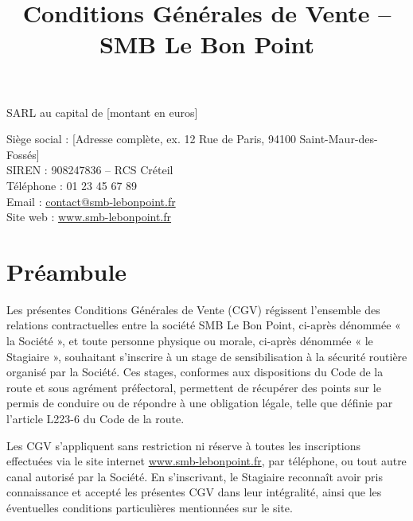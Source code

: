 \documentclass[a4paper,12pt]{article}
\title{\textbf{Conditions Générales de Vente -- SMB Le Bon Point}}
\author{}
\date{}  %
\begin{document}
\maketitle
\vspace{-1.5cm} %

\begin{center}


    SARL au capital de [montant en euros] \\
    \vspace{0.2cm} %
    
    Siège social : [Adresse complète, ex. 12 Rue de Paris, 94100 Saint-Maur-des-Fossés] \\
    SIREN : 908247836 -- RCS Créteil \\
    Téléphone : 01 23 45 67 89 \\
    Email : \href{mailto:contact@smb-lebonpoint.fr}{contact@smb-lebonpoint.fr} \\
    Site web : \href{https://www.smb-lebonpoint.fr}{www.smb-lebonpoint.fr}
\end{center}
\vspace{0.5cm} %

\section*{Préambule}
Les présentes Conditions Générales de Vente (CGV) régissent l'ensemble des relations contractuelles entre la société SMB Le Bon Point, ci-après dénommée « la Société », et toute personne physique ou morale, ci-après dénommée « le Stagiaire », souhaitant s'inscrire à un stage de sensibilisation à la sécurité routière organisé par la Société. Ces stages, conformes aux dispositions du Code de la route et sous agrément préfectoral, permettent de récupérer des points sur le permis de conduire ou de répondre à une obligation légale, telle que définie par l'article L223-6 du Code de la route. 

Les CGV s'appliquent sans restriction ni réserve à toutes les inscriptions effectuées via le site internet \href{https://www.smb-lebonpoint.fr}{www.smb-lebonpoint.fr}, par téléphone, ou tout autre canal autorisé par la Société. En s'inscrivant, le Stagiaire reconnaît avoir pris connaissance et accepté les présentes CGV dans leur intégralité, ainsi que les éventuelles conditions particulières mentionnées sur le site.
\end{document}
